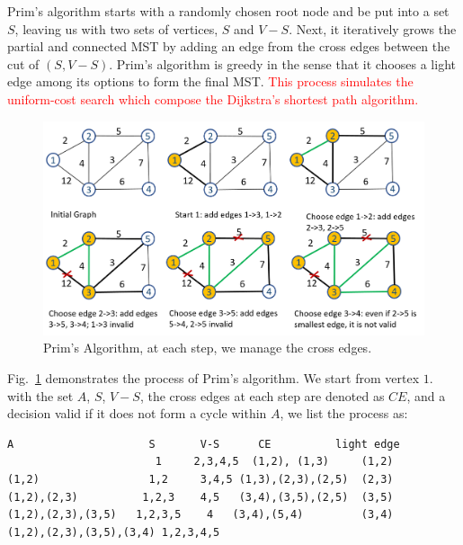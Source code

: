 \documentclass[../main.tex]{subfiles}
\begin{document}
 Prim's algorithm starts with a randomly chosen root node and be put into a set $S$, leaving us with two sets of vertices, $S$ and $V-S$. Next, it iteratively grows the  partial and connected MST by adding an edge from the cross edges between the cut of $(S, V-S)$. Prim's algorithm is greedy in the sense that it chooses a  light edge  among its options to form the final MST.  \textcolor{red}{This process simulates the uniform-cost search which compose the Dijkstra's shortest path algorithm.} 
 
  \begin{figure}[!ht]
     \centering
     \includegraphics[width=0.99\columnwidth]{fig/mst_prim_2.png}
     \caption{Prim's Algorithm, at each step, we manage the cross edges.}
     \label{fig:prim_1}
 \end{figure}
 Fig.~\ref{fig:prim_1} demonstrates the process of Prim's algorithm. We start from vertex $1$. with the set $A$, $S$, $V-S$, the cross edges at each step are denoted as $CE$, and a decision valid if it does not form a cycle within $A$, we list the process as:
 \begin{lstlisting}[numbers=none]
 A                     S       V-S      CE          light edge
                       1     2,3,4,5  (1,2), (1,3)     (1,2)
(1,2)                 1,2     3,4,5 (1,3),(2,3),(2,5)  (2,3)
(1,2),(2,3)          1,2,3    4,5   (3,4),(3,5),(2,5)  (3,5) 
(1,2),(2,3),(3,5)   1,2,3,5    4   (3,4),(5,4)         (3,4) 
(1,2),(2,3),(3,5),(3,4) 1,2,3,4,5
\end{lstlisting}
 
\end{document}
